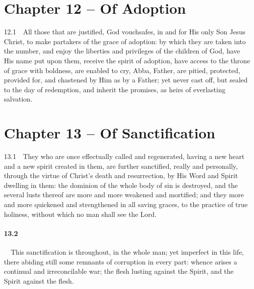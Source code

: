 \section{Chapter 12 -- Of Adoption} 12.1\ \ All those that are justified, God vouchsafes, in and for His only Son Jesus Christ, to make partakers of the grace of adoption: by which they are taken into the number, and enjoy the liberties and privileges of the children of God, have His name put upon them, receive the spirit of adoption, have access to the throne of grace with boldness, are enabled to cry, Abba, Father, are pitied, protected, provided for, and chastened by Him as by a Father; yet never cast off, but sealed to the day of redemption, and inherit the promises, as heirs of everlasting salvation.  

\section{Chapter 13 -- Of Sanctification} 13.1\ \ They who are once effectually called and regenerated, having a new heart and a new spirit created in them, are further sanctified, really and personally, through the virtue of Christ's death and resurrection, by His Word and Spirit dwelling in them: the dominion of the whole body of sin is destroyed, and the several lusts thereof are more and more weakened and mortified; and they more and more quickened and strengthened in all saving graces, to the practice of true holiness, without which no man shall see the Lord.   
\bigskip
\paragraph{13.2}\ \ This sanctification is throughout, in the whole man; yet imperfect in this life, there abiding still some remnants of corruption in every part: whence arises a continual and irreconcilable war; the flesh lusting against the Spirit, and the Spirit against the flesh.   
\bigskip
